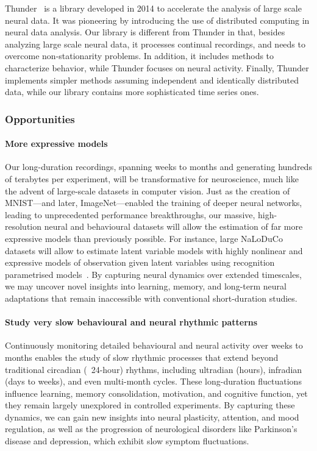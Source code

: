 \documentclass[12pt]{article}
\begin{document}
Thunder~\cite{} is a library developed in 2014 to accelerate the analysis of
large scale neural data. It was pioneering by introducing the use of
distributed computing in neural data analysis.
%
Our library is different from Thunder in that, besides analyzing large scale
neural data, it processes continual recordings, and needs to overcome
non-stationarity problems.
%
In addition, it includes methods to characterize behavior, while
Thunder focuses on neural activity.
%
Finally, Thunder implements simpler methods assuming independent and
identically distributed data, while our library contains more sophisticated
time series ones.

\subsubsection{Opportunities}

\paragraph{More expressive models}
%
Our long-duration recordings, spanning weeks to months and generating hundreds
of terabytes per experiment, will be transformative for neuroscience, much like
the advent of large-scale datasets in computer vision.  Just as the creation of
MNIST—and later, ImageNet—enabled the training of deeper neural networks,
leading to unprecedented performance breakthroughs, our massive,
high-resolution neural and behavioural datasets will allow the estimation of far
more expressive models than previously possible.
%
For instance, large NaLoDuCo datasets will allow to estimate latent variable
models with highly nonlinear and expressive models of observation given latent
variables using recognition parametrised models~\citep{walkerEtAl23}.
%
By capturing neural dynamics over extended timescales, we may uncover novel
insights into learning, memory, and long-term neural adaptations that remain
inaccessible with conventional short-duration studies.

\paragraph{Study very slow behavioural and neural rhythmic patterns}
%
Continuously monitoring detailed behavioural and neural activity over weeks to
months enables the study of slow rhythmic processes that extend beyond
traditional circadian (~24-hour) rhythms, including ultradian (hours),
infradian (days to weeks), and even multi-month cycles. These long-duration
fluctuations influence learning, memory consolidation, motivation, and
cognitive function, yet they remain largely unexplored in controlled
experiments. By capturing these dynamics, we can gain new insights into neural
plasticity, attention, and mood regulation, as well as the progression of
neurological disorders like Parkinson’s disease and depression, which exhibit
slow symptom fluctuations.
\end{document}
